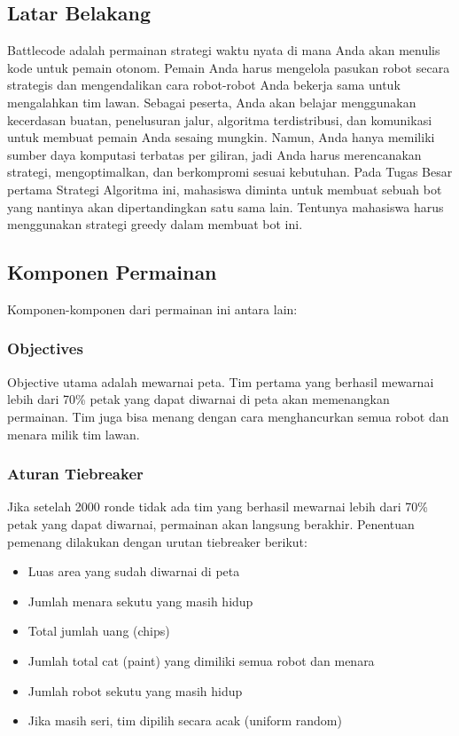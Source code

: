 \documentclass{article}
\begin{document}
\subsection{Latar Belakang}

Battlecode  adalah  permainan  strategi  waktu  nyata  di  mana  Anda  akan  menulis  kode  untuk  pemain 
otonom.  Pemain  Anda  harus  mengelola  pasukan  robot  secara  strategis  dan  mengendalikan  cara 
robot-robot  Anda  bekerja  sama  untuk  mengalahkan  tim  lawan.  Sebagai  peserta,  Anda  akan  belajar 
menggunakan  kecerdasan  buatan,  penelusuran  jalur,  algoritma  terdistribusi,  dan  komunikasi  untuk 
membuat pemain Anda sesaing mungkin. Namun, Anda hanya memiliki sumber daya komputasi terbatas 
per giliran, jadi Anda harus merencanakan strategi, mengoptimalkan, dan berkompromi sesuai kebutuhan. 
Pada  Tugas  Besar  pertama   Strategi Algoritma ini, mahasiswa diminta untuk membuat sebuah bot yang 
nantinya  akan  dipertandingkan  satu  sama lain. Tentunya mahasiswa harus menggunakan strategi greedy 
dalam membuat bot ini. 


\subsection{Komponen Permainan}

Komponen-komponen dari permainan ini antara lain:  


\subsubsection{Objectives}

Objective  utama  adalah  mewarnai  peta.  Tim  pertama  yang  berhasil  mewarnai  lebih  dari  70\% 
petak yang dapat diwarnai di peta akan memenangkan permainan. Tim juga bisa menang dengan 
cara menghancurkan semua robot dan menara milik tim lawan. 


\subsubsection{Aturan Tiebreaker}

Jika setelah 2000 ronde tidak ada tim yang berhasil mewarnai lebih dari 70\% petak yang dapat 
diwarnai, permainan akan langsung berakhir. Penentuan pemenang dilakukan dengan urutan 
tiebreaker berikut: 

\begin{itemize}
\item Luas area yang sudah diwarnai di peta
\item Jumlah menara sekutu yang masih hidup
\item Total jumlah uang (chips)
\item Jumlah total cat (paint) yang dimiliki semua robot dan menara
\item Jumlah robot sekutu yang masih hidup
\item Jika masih seri, tim dipilih secara acak (uniform random)
\end{itemize}
\end{document}
